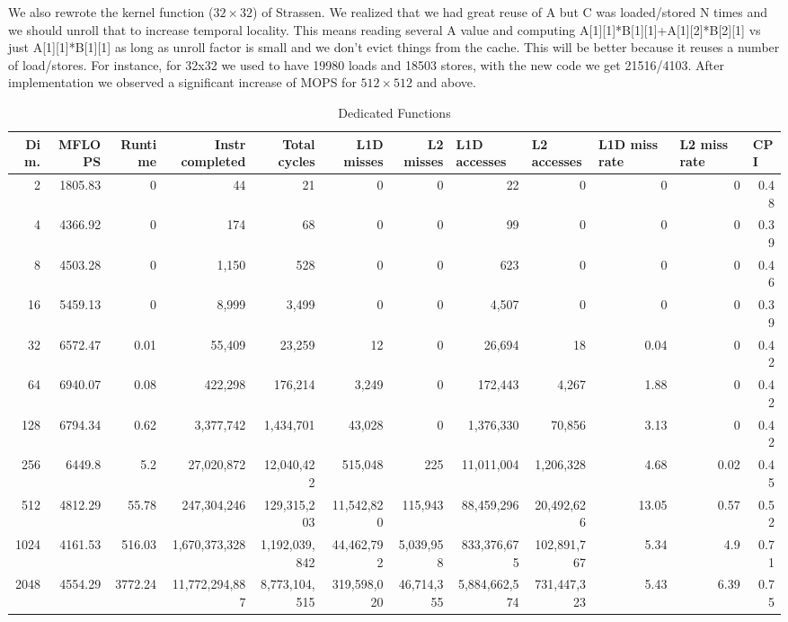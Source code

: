 \documentclass{article}
\begin{document}
We also rewrote the kernel function ($32\times32$) of Strassen.  We realized that we had great reuse of A but C was loaded/stored N times and we should unroll
that to increase temporal locality. This means reading several A value and computing A[1][1]*B[1][1]+A[1][2]*B[2][1] vs just A[1][1]*B[1][1] as long as
unroll factor is small and we don't evict things from the cache.  This will be better because it reuses a number of load/stores.  For instance, for 32x32 we used to have 19980 loads and 18503 stores, with the new code we get 21516/4103.  After implementation we observed a significant increase of MOPS for $512\times512$ and above.

\begin{table}[htbp]
\tiny
\caption{Dedicated Functions}
\begin{tabular}{|r|r|r|r|r|r|r|r|r|r|r|r|}
\hline
Dim. &   MFLOPS &     Runtime & Instr completed & Total cycles & L1D misses & L2 misses & \multicolumn{1}{l|}{L1D accesses} & \multicolumn{1}{l|}{ L2 accesses} & \multicolumn{1}{l|}{L1D miss rate} & \multicolumn{1}{l|}{L2 miss rate} & \multicolumn{1}{l|}{CPI} \\ \hline
2 & 1805.83 & 0 & 44 & 21 & 0 & 0 & 22 & 0 & 0 & 0 & 0.48 \\ \hline
4 & 4366.92 & 0 & 174 & 68 & 0 & 0 & 99 & 0 & 0 & 0 & 0.39 \\ \hline
8 & 4503.28 & 0 & 1,150 & 528 & 0 & 0 & 623 & 0 & 0 & 0 & 0.46 \\ \hline
16 & 5459.13 & 0 & 8,999 & 3,499 & 0 & 0 & 4,507 & 0 & 0 & 0 & 0.39 \\ \hline
32 & 6572.47 & 0.01 & 55,409 & 23,259 & 12 & 0 & 26,694 & 18 & 0.04 & 0 & 0.42 \\ \hline
64 & 6940.07 & 0.08 & 422,298 & 176,214 & 3,249 & 0 & 172,443 & 4,267 & 1.88 & 0 & 0.42 \\ \hline
128 & 6794.34 & 0.62 & 3,377,742 & 1,434,701 & 43,028 & 0 & 1,376,330 & 70,856 & 3.13 & 0 & 0.42 \\ \hline
256 & 6449.8 & 5.2 & 27,020,872 & 12,040,422 & 515,048 & 225 & 11,011,004 & 1,206,328 & 4.68 & 0.02 & 0.45 \\ \hline
512 & 4812.29 & 55.78 & 247,304,246 & 129,315,203 & 11,542,820 & 115,943 & 88,459,296 & 20,492,626 & 13.05 & 0.57 & 0.52 \\ \hline
1024 & 4161.53 & 516.03 & 1,670,373,328 & 1,192,039,842 & 44,462,792 & 5,039,958 & 833,376,675 & 102,891,767 & 5.34 & 4.9 & 0.71 \\ \hline
2048 & 4554.29 & 3772.24 & 11,772,294,887 & 8,773,104,515 & 319,598,020 & 46,714,355 & 5,884,662,574 & 731,447,323 & 5.43 & 6.39 & 0.75 \\ \hline
\end{tabular}
\label{}
\end{table}
\end{document}
